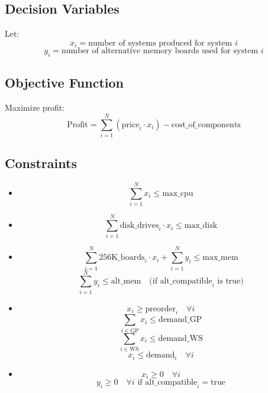\documentclass{article}
\begin{document}
\subsection*{Decision Variables}
Let:
\[
x_i = \text{number of systems produced for system } i
\]
\[
y_i = \text{number of alternative memory boards used for system } i
\]

\subsection*{Objective Function}
Maximize profit:
\[
\text{Profit} = \sum_{i=1}^{N} (\text{price}_i \cdot x_i) - \text{cost\_of\_components}
\]

\subsection*{Constraints}
\begin{itemize}
    \item {}
    \[
    \sum_{i=1}^{N} x_i \leq \text{max\_cpu}
    \]

    \item {}
    \[
    \sum_{i=1}^{N} \text{disk\_drives}_i \cdot x_i \leq \text{max\_disk}
    \]
    
    \item {}
    \[
    \sum_{i=1}^{N} \text{256K\_boards}_i \cdot x_i + \sum_{i=1}^{N} y_i \leq \text{max\_mem}
    \]
    \[
    \sum_{i=1}^{N} y_i \leq \text{alt\_mem}  \quad \text{(if } \text{alt\_compatible}_i \text{ is true)}
    \]

    \item {}
    \[
    x_i \geq \text{preorder}_i \quad \forall i
    \]
    \[
    \sum_{i \in \text{GP}} x_i \leq \text{demand\_GP}
    \]
    \[
    \sum_{i \in \text{WS}} x_i \leq \text{demand\_WS}
    \]
    \[
    x_i \leq \text{demand}_i \quad \forall i
    \]

    \item {}
    \[
    x_i \geq 0 \quad \forall i
    \]
    \[
    y_i \geq 0 \quad \forall i \text{ if } \text{alt\_compatible}_i = \text{true}
    \]
\end{itemize}
\end{document}
